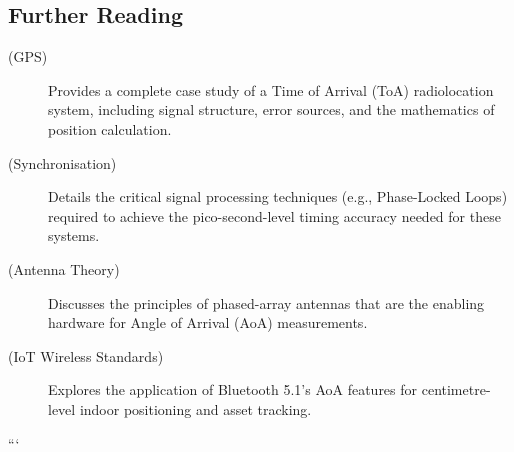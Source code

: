 \begin{importantbox}
\section*{Further Reading}
\begin{description}
    \item[ (GPS)] Provides a complete case study of a Time of Arrival (ToA) radiolocation system, including signal structure, error sources, and the mathematics of position calculation.
    \item[ (Synchronisation)] Details the critical signal processing techniques (e.g., Phase-Locked Loops) required to achieve the pico-second-level timing accuracy needed for these systems.
    \item[ (Antenna Theory)] Discusses the principles of phased-array antennas that are the enabling hardware for Angle of Arrival (AoA) measurements.
    \item[ (IoT Wireless Standards)] Explores the application of Bluetooth 5.1's AoA features for centimetre-level indoor positioning and asset tracking.
\end{description}
\end{importantbox}```
